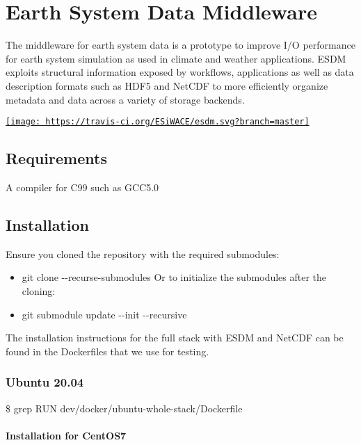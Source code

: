 \section{Earth System Data Middleware}%
\label{earth-system-data-middleware}

The middleware for earth system data is a prototype to improve I/O
performance for earth system simulation as used in climate and weather
applications. ESDM exploits structural information exposed by workflows,
applications as well as data description formats such as HDF5 and NetCDF
to more efficiently organize metadata and data across a variety of
storage backends.

\href{https://travis-ci.org/ESiWACE/esdm}{\texttt{[image: https://travis-ci.org/ESiWACE/esdm.svg?branch=master]}}

\subsection{Requirements}%
\label{requirements}

A compiler for C99 such as GCC5.0

\subsection{Installation}%
\label{installation}

Ensure you cloned the repository with the required submodules:

\begin{itemize}
  \item git clone -\/-recurse-submodules Or to initialize the submodules after the cloning:
  \item git submodule update -\/-init -\/-recursive
\end{itemize}

The installation instructions for the full stack with ESDM and NetCDF
can be found in the Dockerfiles that we use for testing.

\subsubsection{Ubuntu 20.04}%
\label{ubuntu-2004}

\$ grep RUN dev/docker/ubuntu-whole-stack/Dockerfile

\paragraph{Installation for CentOS7}%
\label{installation-for-centos7}

